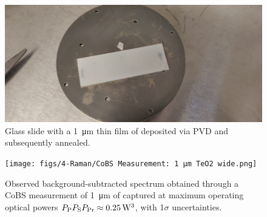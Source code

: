 \begin{figure}[t]
  \centering
  \hspace{1em}\includegraphics[width=.75\textwidth]{figs/4-Raman/slide-with-TeO2-film-on-substrate.jpeg}
  \hspace{1em}\caption{Glass slide with a \SI{1}{\micro\meter} thin film of  deposited via \ac{PVD} and subsequently annealed.}
  \label{fig:Raman:TeO2slide}
\end{figure}

\begin{figure}[h!]
  \centering
  \hspace{-2em}\texttt{[image: figs/4-Raman/CoBS Measurement: 1 μm TeO2 wide.png]}
  \caption[Observed spectrum obtained through a \ac{CoBS} measurement of \SI{1}{\micro\meter} of .]{Observed background-subtracted spectrum obtained through a \ac{CoBS} measurement of \SI{1}{\micro\meter} of  captured at maximum operating optical powers \(P_{\rm P}P_{\rm S}P_{\rm Pr} \approx \SI{0.25}{\cubic\watt}\), with 1\(\sigma\) uncertainties.}
  \label{fig:Raman:1umTeO2}
\end{figure}


